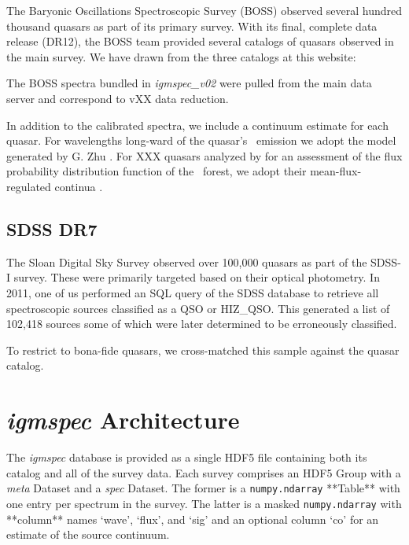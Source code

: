 \documentclass[12pt,preprint]{aastex}
\begin{document}
The Baryonic Oscillations Spectroscopic Survey (BOSS)
observed several hundred thousand quasars as part of its
primary survey.  With its final, complete data release
(DR12), the BOSS team provided several catalogs of quasars
observed in the main survey.  We have drawn from the three
catalogs at this website: 

The BOSS spectra bundled in {\it igmspec\_v02} were pulled
from the main data server and correspond to vXX data reduction.

In addition to the calibrated spectra, we include a
continuum estimate for each quasar.  For wavelengths
long-ward of the quasar's \lya\ emission we adopt
the model generated by G. Zhu 
\citep[see][for details on the algorithm]{zhu15}.
For XXX quasars analyzed by \cite{lee1X} for an assessment
of the flux probability distribution function of the 
\lya\ forest, we adopt their mean-flux-regulated continua
\citep{lee1Xb}.

\subsection{SDSS DR7}

The Sloan Digital Sky Survey observed over 100,000 quasars
as part of the SDSS-I survey.  These were primarily targeted
based on their optical photometry.  In 2011, one of us
performed an SQL query of the SDSS database to retrieve
all spectroscopic sources classified as a QSO or HIZ\_QSO. 
This generated a list of 102,418 sources some of which 
were later determined to be erroneously classified.

To restrict to bona-fide quasars, we cross-matched this
sample against the \cite{meyers1X} quasar catalog.

%

\section{{\it igmspec} Architecture}
\label{sec:arch}

The {\it igmspec} database is provided as a single HDF5 file
containing both its catalog and all of the survey 
data.  Each survey comprises an HDF5 Group
with a {\it meta} Dataset and a {\it spec} Dataset.
The former is a {\tt numpy.ndarray} **Table** with
one entry per spectrum in the survey.
The latter is a masked {\tt numpy.ndarray} 
with **column** names `wave', `flux', and `sig'
and an optional column `co' for an estimate of the source
continuum.  
\end{document}
